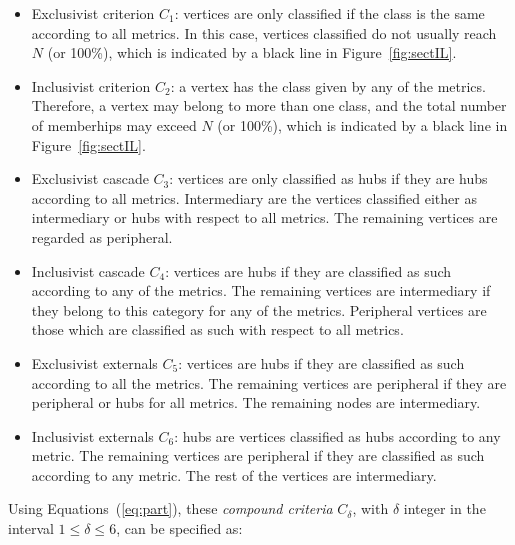 \documentclass[%
	aip,
	jmp,%
	amsmath,amssymb,
	reprint,%
]{revtex4-1}
\begin{document}
\begin{itemize}
	\item Exclusivist criterion $C_1$:  vertices are only classified if the class is the same according to all metrics.
		In this case, vertices classified do not usually reach $N$ (or 100\%),
		which is indicated by a black line in Figure~\ref{fig:sectIL}.
	\item Inclusivist criterion $C_2$: a vertex has the class given by any of the metrics.
		Therefore, a vertex may belong to more than one class, and the total number of memberhips may exceed $N$ (or 100\%),
		which is indicated by a black line in Figure~\ref{fig:sectIL}.
	\item Exclusivist cascade $C_3$: vertices are only classified as hubs if they are hubs according to all metrics.
		Intermediary are the vertices classified either as intermediary or hubs with respect to all metrics.
		The remaining vertices are regarded as peripheral.
	\item Inclusivist cascade $C_4$: vertices are hubs if they are classified as such according to any of the metrics.
		The remaining vertices are intermediary if they belong to this category for any of the metrics.
		Peripheral vertices are those which are classified as such with respect to all metrics.
	\item Exclusivist externals $C_5$: vertices are hubs if they are classified as such according to all the metrics.
		The remaining vertices are peripheral if they are peripheral or hubs for all metrics.
		The remaining nodes are intermediary.
	\item Inclusivist externals $C_6$: hubs are vertices classified as hubs according to any metric. The remaining vertices are peripheral if they are classified as such according to any metric. The rest of the vertices are intermediary.
\end{itemize}

Using Equations~(\ref{eq:part}), these \emph{compound criteria} $C_\delta$, with $\delta$ integer in the interval $1\leq\delta\leq6$, can be specified as:
\end{document}
